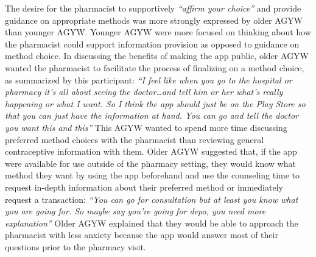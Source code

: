 The desire for the pharmacist to supportively \textit{``affirm your choice”}  and provide guidance on appropriate methods was more strongly expressed by older AGYW than younger AGYW. Younger AGYW were more focused on thinking about how the pharmacist could support information provision as opposed to guidance on method choice. In discussing the benefits of making the app public, older AGYW wanted the pharmacist to facilitate the process of finalizing on a method choice, as summarized by this participant: \textit{``I feel like when you go to the hospital or pharmacy it's all about seeing the doctor…and tell him or her what's really happening or what I want. So I think the app should just be on the Play Store so that you can just have the information at hand. You can go and tell the doctor you want this and this”}  This AGYW wanted to spend more time discussing preferred method choices with the pharmacist than reviewing general contraceptive information with them. Older AGYW suggested that, if the app were available for use outside of the pharmacy setting, they would know what method they want by using the app beforehand and use the counseling time to request in-depth information about their preferred method or immediately request a transaction: \textit{``You can go for consultation but at least you know what you are going for. So maybe say you're going for depo, you need more explanation”}   Older AGYW explained that they would be able to approach the pharmacist with less anxiety because the app would answer most of their questions prior to the pharmacy visit. 



